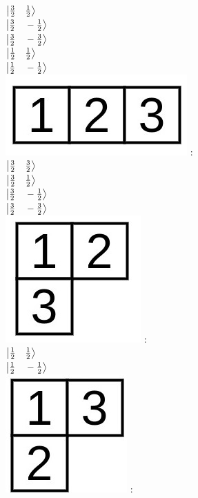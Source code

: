 \documentclass[12pt,a4paper]{article}
\begin{document}
$ \ket{\frac{3}{2}\quad \frac{1}{2}}$ \\

$ \ket{\frac{3}{2} \quad -\frac{1}{2}}$ \\

$ \ket{\frac{3}{2} \quad -\frac{3}{2}}$ \\

$ \ket{\frac{1}{2} \quad\frac{1}{2}}$ \\

$ \ket{\frac{1}{2} \quad-\frac{1}{2}}$ \\






\includegraphics[scale=0.6]{build/young-123.jpg} : \\

$ \ket{\frac{3}{2}\quad \frac{3}{2}}$ \\

$ \ket{\frac{3}{2}\quad \frac{1}{2}}$ \\

$ \ket{\frac{3}{2} \quad -\frac{1}{2}}$ \\

$ \ket{\frac{3}{2} \quad -\frac{3}{2}}$ \\

\includegraphics[scale=0.6]{build/young-12.jpg} : \\

$ \ket{\frac{1}{2} \quad\frac{1}{2}}$ \\

$ \ket{\frac{1}{2} \quad-\frac{1}{2}}$ \\

\includegraphics[scale=0.6]{build/young-13.jpg} : \\
\end{document}
